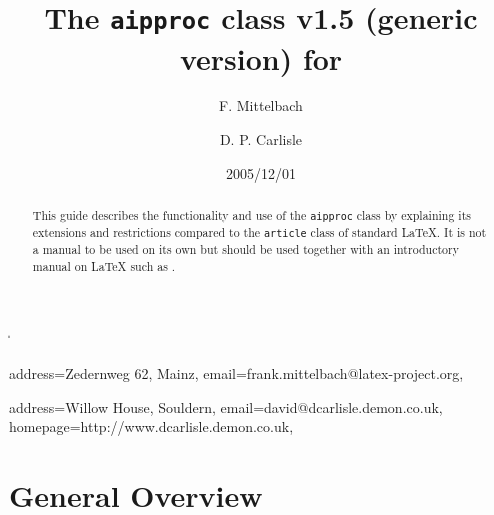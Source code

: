 \def\next{pdf}
  {%
  \renewcommand\selectedlayoutstyle{8d}
   \usepackage[draft=false,bookmarksopen]
              {hyperref}
  }
  {}
\layoutstyle\selectedlayoutstyle


\listfiles

\usepackage{ttct0001}

\newcommand\BibTeX{\textsc{Bib}\TeX{}}

\usepackage{shortvrb}
\MakeShortVerb\|

\newcommand\aipcls{\texttt{aipproc} class}


\hfuzz=5pt

\makeatletter
   \def\@oddfoot{\reset@font
                 \copyright{} 2004 AIP
                 \hfil\@title
                 \hfil\@date\hfil\thepage}
\makeatother



\author{F. Mittelbach}{
  address={Zedernweg 62, Mainz},
  email={frank.mittelbach@latex-project.org},
}

\author{D. P. Carlisle}{
  address={Willow House, Souldern},
  email={david@dcarlisle.demon.co.uk},
  homepage={http://www.dcarlisle.demon.co.uk},
}

\title{The \aipcls{} v1.5
 (generic version)
       for \LaTeXe}
\date{2005/12/01}


\begin{abstract}
  This guide describes the functionality and use of the
  \aipcls{}
  by explaining its extensions and restrictions compared to the
  \texttt{article} class of standard \LaTeX. It is not a manual to be
  used on its own but should be used together with an introductory
  manual on \LaTeX{} such as \cite{A-W:LLa94}.
\end{abstract}

\maketitle

\tableofcontents

\bigskip

\section{General Overview}

